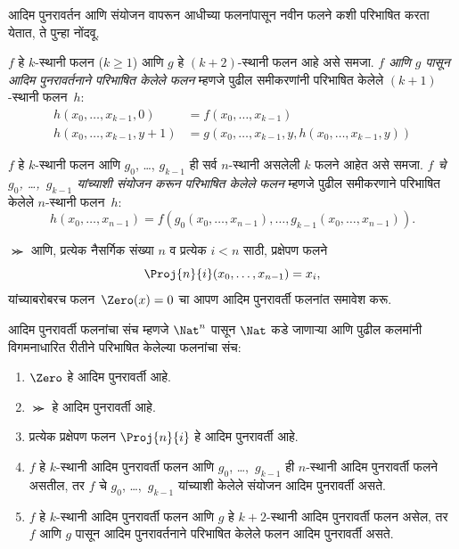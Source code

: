 \documentclass[../../../include/open-logic-section]{subfiles}
\begin{document}

आदिम पुनरावर्तन आणि संयोजन वापरून आधीच्या फलनांपासून नवीन फलने कशी
परिभाषित करता येतात, ते पुन्हा नोंदवू.

\begin{defn}
   $f$ हे $k$-स्थानी फलन ($k\ge 1$)
  आणि $g$ हे $(k+2)$-स्थानी फलन आहे असे समजा. \emph{$f$ आणि $g$ पासून
  आदिम पुनरावर्तनाने परिभाषित केलेले फलन} म्हणजे पुढील समीकरणांनी परिभाषित
  केलेले $(k+1)$-स्थानी फलन~$h$:
  \begin{align*}
    h(x_0,\dots,x_{k-1},0) & =  f(x_0,\dots,x_{k-1}) \\
    h(x_0,\dots,x_{k-1},y+1) & = g(x_0,\dots,x_{k-1}, y, h(x_0,\dots,x_{k-1}, y))
  \end{align*}
\end{defn}

\begin{defn}
   $f$ हे $k$-स्थानी फलन आणि $g_0$, \dots,
  $g_{k-1}$ ही सर्व $n$-स्थानी असलेली $k$ फलने आहेत असे समजा.
  \emph{$f$ चे $g_0$, \dots,~$g_{k-1}$ यांच्याशी संयोजन करून परिभाषित
    केलेले फलन} म्हणजे पुढील समीकरणाने परिभाषित केलेले $n$-स्थानी
  फलन~$h$:
  \[
  h(x_0, \dots, x_{n-1}) =
  f(g_0(x_0, \dots, x_{n-1}), \dots, g_{k-1}(x_0, \dots, x_{n-1})).
  \]
\end{defn}

$\Succ$ आणि, प्रत्येक नैसर्गिक संख्या $n$ व प्रत्येक $i < n$ साठी,
प्रक्षेपण फलने
\[
\Proj{n}{i}(x_0,\dots,x_{n-1}) = x_i,
\]
यांच्याबरोबरच फलन~$\Zero(x) = 0$ चा आपण आदिम पुनरावर्ती फलनांत
समावेश करू.

\begin{defn}
  आदिम पुनरावर्ती फलनांचा संच म्हणजे $\Nat^n$ पासून $\Nat$ कडे जाणाऱ्या
  आणि पुढील कलमांनी विगमनाधारित रीतीने परिभाषित केलेल्या फलनांचा संच:
  \begin{enumerate}
  \item $\Zero$ हे आदिम पुनरावर्ती आहे.
  \item $\Succ$ हे आदिम पुनरावर्ती आहे.
  \item प्रत्येक प्रक्षेपण फलन $\Proj{n}{i}$ हे आदिम पुनरावर्ती आहे.
  \item $f$ हे $k$-स्थानी आदिम पुनरावर्ती फलन आणि $g_0$,
    \dots,~$g_{k-1}$ ही $n$-स्थानी आदिम पुनरावर्ती फलने असतील, तर
    $f$ चे $g_0$, \dots,~$g_{k-1}$ यांच्याशी केलेले संयोजन आदिम
    पुनरावर्ती असते.
  \item $f$ हे $k$-स्थानी आदिम पुनरावर्ती फलन आणि $g$ हे $k+2$-स्थानी
    आदिम पुनरावर्ती फलन असेल, तर $f$ आणि $g$ पासून आदिम पुनरावर्तनाने
    परिभाषित केलेले फलन आदिम पुनरावर्ती असते.
\end{enumerate}
\end{defn}
\end{document}
